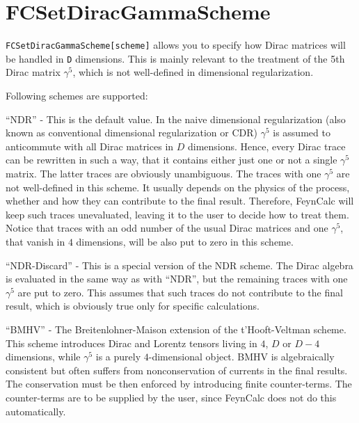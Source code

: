 \documentclass[../FeynCalcManual.tex]{subfiles}
\begin{document}
\hypertarget{fcsetdiracgammascheme}{%
\section{FCSetDiracGammaScheme}\label{fcsetdiracgammascheme}}

\texttt{FCSetDiracGammaScheme[\allowbreak{}scheme]} allows you to
specify how Dirac matrices will be handled in \texttt{D} dimensions.
This is mainly relevant to the treatment of the 5th Dirac matrix
\(\gamma^5\), which is not well-defined in dimensional regularization.

Following schemes are supported:

``NDR'' - This is the default value. In the naive dimensional
regularization (also known as conventional dimensional regularization or
CDR) \(\gamma^5\) is assumed to anticommute with all Dirac matrices in
\(D\) dimensions. Hence, every Dirac trace can be rewritten in such a
way, that it contains either just one or not a single \(\gamma^5\)
matrix. The latter traces are obviously unambiguous. The traces with one
\(\gamma^5\) are not well-defined in this scheme. It usually depends on
the physics of the process, whether and how they can contribute to the
final result. Therefore, FeynCalc will keep such traces unevaluated,
leaving it to the user to decide how to treat them. Notice that traces
with an odd number of the usual Dirac matrices and one \(\gamma^5\),
that vanish in \(4\) dimensions, will be also put to zero in this
scheme.

``NDR-Discard'' - This is a special version of the NDR scheme. The Dirac
algebra is evaluated in the same way as with ``NDR'', but the remaining
traces with one \(\gamma^5\) are put to zero. This assumes that such
traces do not contribute to the final result, which is obviously true
only for specific calculations.

``BMHV'' - The Breitenlohner-Maison extension of the t'Hooft-Veltman
scheme. This scheme introduces Dirac and Lorentz tensors living in
\(4\), \(D\) or \(D-4\) dimensions, while \(\gamma^5\) is a purely
\(4\)-dimensional object. BMHV is algebraically consistent but often
suffers from nonconservation of currents in the final results. The
conservation must be then enforced by introducing finite counter-terms.
The counter-terms are to be supplied by the user, since FeynCalc does
not do this automatically.
\end{document}
